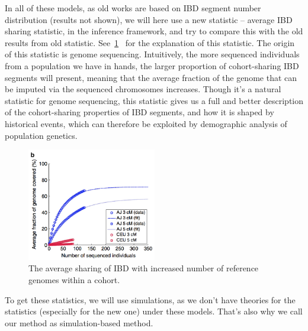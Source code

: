 \documentclass{bioinfo}
\begin{document}
In all of these models, as old works are based on IBD segment number distribution (results not shown), we will here use a new statistic -- average IBD sharing statistic, in the inference framework, and try to compare this with the old results from old statistic. See~\ref{fig:newstats}~\cite{Carmi2014} for the explanation of this statistic. The origin of this statistic is genome sequencing. Intuitively, the more sequenced individuals from a population we have in hands, the larger proportion of cohort-sharing IBD segments will present, meaning that the average fraction of the genome that can be imputed via the sequenced chromosomes increases. Though it's a natural statistic for genome sequencing, this statistic gives us a full and better description of the cohort-sharing properties of IBD segments, and how it is shaped by historical events, which can therefore be exploited by demographic analysis of population genetics.

\begin{figure}[h]
\centerline{\includegraphics[width=160pt, height=140pt]{NewStats}}
\caption{The average sharing of IBD with increased number of reference genomes within a cohort.}\label{fig:newstats}
\end{figure}

To get these statistics, we will use simulations, as we don't have theories for the statistics (especially for the new one) under these models. That's also why we call our method as simulation-based method.
\end{document}
